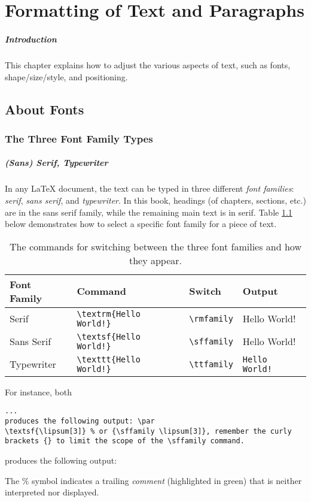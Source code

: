 \chapter{Formatting of Text and Paragraphs}

\paragraph{Introduction}
This chapter explains how to adjust the various aspects of text, such as fonts, shape/size/style, and positioning.

\section{About Fonts}

\subsection{The Three Font Family Types}

\paragraph{(Sans) Serif, Typewriter}
In any \LaTeX{} document, the text can be typed in three different \textit{font families}: \textit{serif}, \textit{sans serif}, and \textit{typewriter}. In this book, headings (of chapters, sections, etc.) are in the sans serif family, while the remaining main text is in serif. Table \ref{tab:fontfamily} below demonstrates how to select a specific font family for a piece of text.
\begin{table}
\begin{tabularx}{\textwidth}{|l|X|l|l|}
\hline
Font Family & Command & Switch & Output \\
\hline
Serif & \texttt{\textbackslash textrm\{Hello World!\}}& \texttt{\textbackslash rmfamily} & \textrm{Hello World!} \\
\hline
Sans Serif & \texttt{\textbackslash textsf\{Hello World!\}}& \texttt{\textbackslash sffamily} & \textsf{Hello World!} \\
\hline
Typewriter & \texttt{\textbackslash texttt\{Hello World!\}}& \texttt{\textbackslash ttfamily} & \texttt{Hello World!} \\
\hline
\end{tabularx}
\caption{The commands for switching between the three font families and how they appear.}
\label{tab:fontfamily}
\end{table}
For instance, both
\begin{lstlisting}
... 
produces the following output: \par
\textsf{\lipsum[3]} % or {\sffamily \lipsum[3]}, remember the curly brackets {} to limit the scope of the \sffamily command.
\end{lstlisting}
produces the following output: \par
{\sffamily \lipsum[3]} \par
The \% symbol indicates a trailing \textit{comment} (highlighted in green) that is neither interpreted nor displayed.

